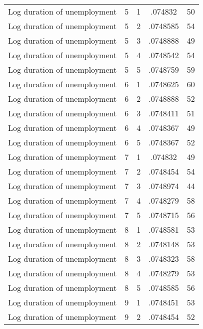 \begin{tabular}{l*{4}{c}}
Log duration of unemployment&           5&           1&     .074832&          50\\
Log duration of unemployment&           5&           2&    .0748585&          54\\
Log duration of unemployment&           5&           3&    .0748888&          49\\
Log duration of unemployment&           5&           4&    .0748542&          54\\
Log duration of unemployment&           5&           5&    .0748759&          59\\
Log duration of unemployment&           6&           1&    .0748625&          60\\
Log duration of unemployment&           6&           2&    .0748888&          52\\
Log duration of unemployment&           6&           3&    .0748411&          51\\
Log duration of unemployment&           6&           4&    .0748367&          49\\
Log duration of unemployment&           6&           5&    .0748367&          52\\
Log duration of unemployment&           7&           1&     .074832&          49\\
Log duration of unemployment&           7&           2&    .0748454&          54\\
Log duration of unemployment&           7&           3&    .0748974&          44\\
Log duration of unemployment&           7&           4&    .0748279&          58\\
Log duration of unemployment&           7&           5&    .0748715&          56\\
Log duration of unemployment&           8&           1&    .0748581&          53\\
Log duration of unemployment&           8&           2&    .0748148&          53\\
Log duration of unemployment&           8&           3&    .0748323&          58\\
Log duration of unemployment&           8&           4&    .0748279&          53\\
Log duration of unemployment&           8&           5&    .0748585&          56\\
Log duration of unemployment&           9&           1&    .0748451&          53\\
Log duration of unemployment&           9&           2&    .0748454&          52\\

\end{tabular}
